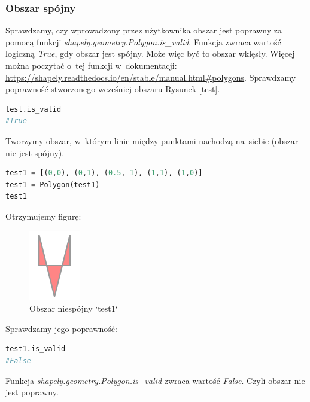 \documentclass{article}
\begin{document}
\subsubsection*{Obszar spójny}
Sprawdzamy, czy wprowadzony przez użytkownika obszar jest poprawny za pomocą funkcji \textit{shapely.geometry.Polygon.is\_valid}. Funkcja zwraca
wartość logiczną \textit{True}, gdy obszar jest spójny. Może więc być to obszar wklęsły. Więcej można poczytać o~tej funkcji w~dokumentacji:  \url{https://shapely.readthedocs.io/en/stable/manual.html#polygons}.
Sprawdzamy poprawność stworzonego wcześniej obszaru Rysunek \ref{test}.
\begin{lstlisting}[language=Python, caption=Obszar spójny]
test.is_valid
#True
\end{lstlisting}
Tworzymy obszar, w~którym linie między punktami nachodzą na~siebie (obszar nie jest spójny).
\begin{lstlisting}[language=Python, caption=Obszar spójny]
test1 = [(0,0), (0,1), (0.5,-1), (1,1), (1,0)]
test1 = Polygon(test1)
test1
\end{lstlisting}
Otrzymujemy figurę:
\begin{figure}[h] 
\begin{center}
\includegraphics[scale = 2]{"niespojny.PNG"}
\end{center}
\caption{Obszar niespójny `test1`}
\label{}
\end{figure}
Sprawdzamy jego poprawność:
\begin{lstlisting}[language=Python, caption=Obszar niespójny]
test1.is_valid
#False
\end{lstlisting}
Funkcja \textit{shapely.geometry.Polygon.is\_valid} zwraca wartość \textit{False}. Czyli obszar nie jest poprawny.
\end{document}
